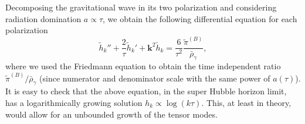 Decomposing the gravitational wave in its two polarization and considering radiation domination $a \propto\tau$, we obtain the following differential equation for each polarization
$$
\tilde h_k''+\frac{2}{\tau}\tilde h_k'+\mathbf k^2\tilde h_k=\frac{6}{\tau^2}\frac{\tilde\pi^{(B)}}{\bar \rho_\gamma},
$$
where we used the Friedmann equation to obtain the time independent ratio $\tilde\pi^{(B)}/\bar\rho_\gamma$ (since numerator and denominator scale with the same power of $a(\tau)$). It is easy to check that the above equation, in the super Hubble horizon limit, has a logarithmically growing solution $h_k\propto\log (k\tau)$. This, at least in theory, would allow for an unbounded growth of the tensor modes. 